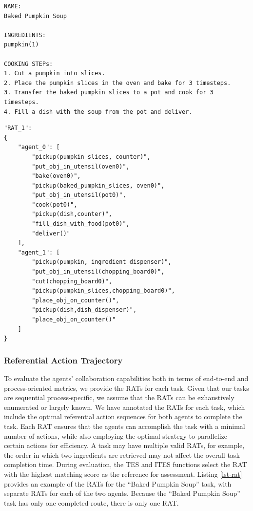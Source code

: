 \documentclass[11pt]{article}
\begin{document}
\newpage

\begin{lstlisting}[caption={Recipe example},label={lst-recipe}]
NAME:
Baked Pumpkin Soup

INGREDIENTS:
pumpkin(1)

COOKING STEPs:
1. Cut a pumpkin into slices.
2. Place the pumpkin slices in the oven and bake for 3 timesteps.
3. Transfer the baked pumpkin slices to a pot and cook for 3 timesteps.
4. Fill a dish with the soup from the pot and deliver.
\end{lstlisting}


\begin{lstlisting}[caption={RAT of "Baked Pumpkin Soup" task},label={lst-rat}]
"RAT_1": 
{
    "agent_0": [
        "pickup(pumpkin_slices, counter)",
        "put_obj_in_utensil(oven0)",
        "bake(oven0)",
        "pickup(baked_pumpkin_slices, oven0)",
        "put_obj_in_utensil(pot0)",
        "cook(pot0)",
        "pickup(dish,counter)",
        "fill_dish_with_food(pot0)",
        "deliver()"
    ],
    "agent_1": [
        "pickup(pumpkin, ingredient_dispenser)",
        "put_obj_in_utensil(chopping_board0)",
        "cut(chopping_board0)",
        "pickup(pumpkin_slices,chopping_board0)",
        "place_obj_on_counter()",
        "pickup(dish,dish_dispenser)",
        "place_obj_on_counter()"
    ]
}
\end{lstlisting}

\subsubsection{Referential Action Trajectory}


To evaluate the agents' collaboration capabilities both in terms of end-to-end and process-oriented metrics, we provide the RATs for each task. Given that our tasks are sequential process-specific, we assume that the RATs can be exhaustively enumerated or largely known. We have annotated the RATs for each task, which include the optimal referential action sequences for both agents to complete the task. Each RAT ensures that the agents can accomplish the task with a minimal number of actions, while also employing the optimal strategy to parallelize certain actions for efficiency. A task may have multiple valid RATs, for example, the order in which two ingredients are retrieved may not affect the overall task completion time. During evaluation, the TES and ITES functions select the RAT with the highest matching score as the reference for assessment. Listing \ref{lst-rat} provides an example of the RATs for the ``Baked Pumpkin Soup'' task, with separate RATs for each of the two agents. Because the ``Baked Pumpkin Soup'' task has only one completed route, there is only one RAT.
\end{document}
